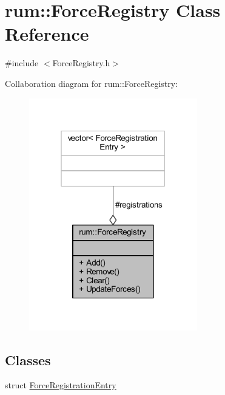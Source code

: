 \hypertarget{classrum_1_1_force_registry}{}\section{rum\+:\+:Force\+Registry Class Reference}
\label{classrum_1_1_force_registry}


{\ttfamily \#include $<$Force\+Registry.\+h$>$}



Collaboration diagram for rum\+:\+:Force\+Registry\+:\nopagebreak
\begin{figure}[H]
\begin{center}
\leavevmode
\includegraphics[width=208pt]{classrum_1_1_force_registry__coll__graph}
\end{center}
\end{figure}
\subsection*{Classes}
\begin{DoxyCompactItemize}
\item 
struct \hyperlink{structrum_1_1_force_registry_1_1_force_registration_entry}{Force\+Registration\+Entry}
\end{DoxyCompactItemize}
